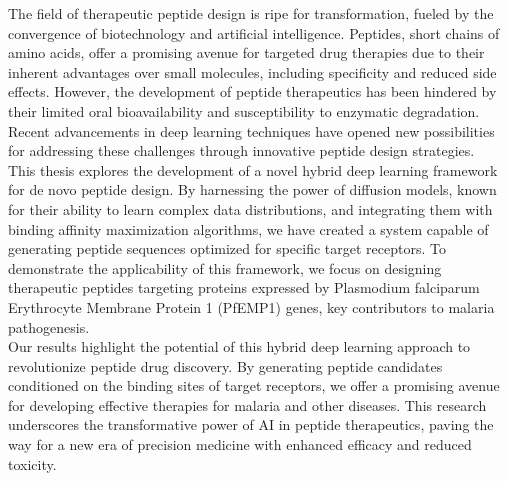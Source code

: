 The field of therapeutic peptide design is ripe for transformation, fueled by the convergence of biotechnology and artificial intelligence. Peptides, short chains of amino acids, offer a promising avenue for targeted drug therapies due to their inherent advantages over small molecules, including specificity and reduced side effects. However, the development of peptide therapeutics has been hindered by their limited oral bioavailability and susceptibility to enzymatic degradation. Recent advancements in deep learning techniques have opened new possibilities for addressing these challenges through innovative peptide design strategies. \\

This thesis explores the development of a novel hybrid deep learning framework for de novo peptide design. By harnessing the power of diffusion models, known for their ability to learn complex data distributions, and integrating them with binding affinity maximization algorithms, we have created a system capable of generating peptide sequences optimized for specific target receptors. To demonstrate the applicability of this framework, we focus on designing therapeutic peptides targeting proteins expressed by Plasmodium falciparum Erythrocyte Membrane Protein 1 (PfEMP1) genes, key contributors to malaria pathogenesis. \\

Our results highlight the potential of this hybrid deep learning approach to revolutionize peptide drug discovery. By generating peptide candidates conditioned on the binding sites of target receptors, we offer a promising avenue for developing effective therapies for malaria and other diseases. This research underscores the transformative power of AI in peptide therapeutics, paving the way for a new era of precision medicine with enhanced efficacy and reduced toxicity.
